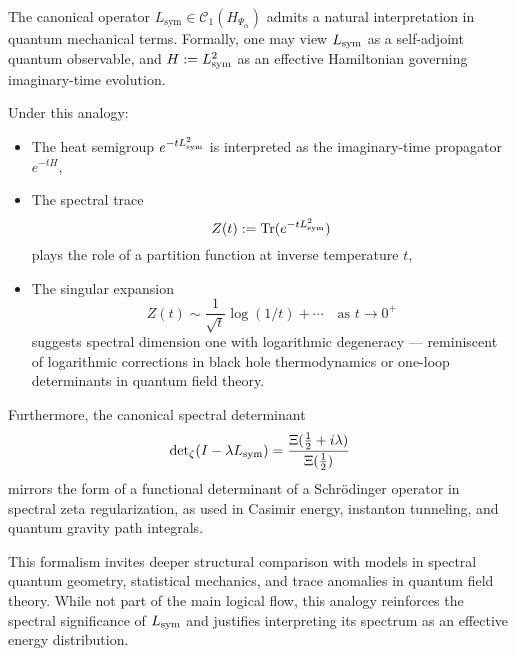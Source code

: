 \begin{remark}
\label{rem:operator_physics_analogy}
The canonical operator \( L_{\mathrm{sym}} \in \mathcal{C}_1(H_{\Psi_\alpha}) \) admits a natural interpretation in quantum mechanical terms. Formally, one may view \( L_{\mathrm{sym}} \) as a self-adjoint quantum observable, and \( H := L_{\mathrm{sym}}^2 \) as an effective Hamiltonian governing imaginary-time evolution.

Under this analogy:
\begin{itemize}
  \item The heat semigroup \( e^{-t L_{\mathrm{sym}}^2} \) is interpreted as the imaginary-time propagator \( e^{-t H} \),
  \item The spectral trace
  \[
  Z(t) := \operatorname{Tr}(e^{-t L_{\mathrm{sym}}^2})
  \]
  plays the role of a partition function at inverse temperature \( t \),
  \item The singular expansion
  \[
  Z(t) \sim \frac{1}{\sqrt{t}} \log(1/t) + \cdots \quad \text{as } t \to 0^+
  \]
  suggests spectral dimension one with logarithmic degeneracy — reminiscent of logarithmic corrections in black hole thermodynamics or one-loop determinants in quantum field theory.
\end{itemize}

Furthermore, the canonical spectral determinant
\[
\det\nolimits_{\zeta}(I - \lambda L_{\mathrm{sym}}) = \frac{\Xi(\tfrac{1}{2} + i\lambda)}{\Xi(\tfrac{1}{2})}
\]
mirrors the form of a functional determinant of a Schrödinger operator in spectral zeta regularization, as used in Casimir energy, instanton tunneling, and quantum gravity path integrals.

This formalism invites deeper structural comparison with models in spectral quantum geometry, statistical mechanics, and trace anomalies in quantum field theory. While not part of the main logical flow, this analogy reinforces the spectral significance of \( L_{\mathrm{sym}} \) and justifies interpreting its spectrum as an effective energy distribution.
\end{remark}
